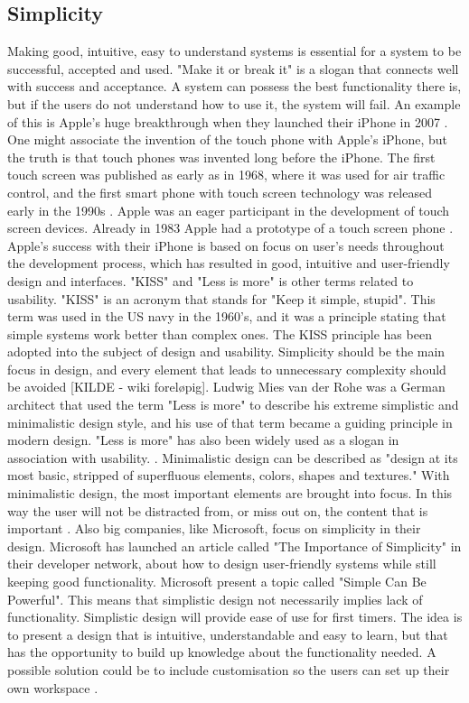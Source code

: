 \subsection{Simplicity}
Making good, intuitive, easy to understand systems is essential for a system to be successful, accepted and used. "Make it or break it" is a slogan that connects well with success and acceptance. A system can possess the best functionality there is, but if the users do not understand how to use it, the system will fail. An example of this is Apple's huge breakthrough when they launched their iPhone in 2007 \cite{iphone2007}. One might associate the invention of the touch phone with Apple's iPhone, but the truth is that touch phones was invented long before the iPhone. The first touch screen was published as early as in 1968, where it was used for air traffic control, and the first smart phone with touch screen technology was released early in the 1990s \cite{touchphone}. Apple was an eager participant in the development of touch screen devices. Already in 1983 Apple had a prototype of a touch screen phone \cite{applefirst1983}. Apple's success with their iPhone is based on focus on user's needs throughout the development process, which has resulted in good, intuitive and user-friendly design and interfaces. "KISS" and "Less is more" is other terms related to usability. "KISS" is an acronym that stands for "Keep it simple, stupid". This term was used in the US navy in the 1960's, and it was a principle stating that simple systems work better than complex ones. The KISS principle has been adopted into the subject of design and usability. Simplicity should be the main focus in design, and every element that leads to unnecessary complexity should be avoided [KILDE - wiki foreløpig]. Ludwig Mies van der Rohe was a German architect that used the term "Less is more" to describe his extreme simplistic and minimalistic design style, and his use of that term became a guiding principle in modern design. "Less is more" has also been widely used as a slogan in association with usability. \cite{rohe}. Minimalistic design can be described as "design at its most basic, stripped of superfluous elements, colors, shapes and textures." With minimalistic design, the most important elements are brought into focus. In this way the user will not be distracted from, or miss out on, the content that is important \cite{lessismore}. Also big companies, like Microsoft, focus on simplicity in their design. Microsoft has launched an article called "The Importance of Simplicity" in their developer network, about how to design user-friendly systems while still keeping good functionality. Microsoft present a topic called "Simple Can Be Powerful". This means that simplistic design not necessarily implies lack of functionality. Simplistic design will provide ease of use for first timers. The idea is to present a design that is intuitive, understandable and easy to learn, but that has the opportunity to build up knowledge about the functionality needed. A possible solution could be to include customisation so the users can set up their own workspace \cite{msdnsimple}.             

